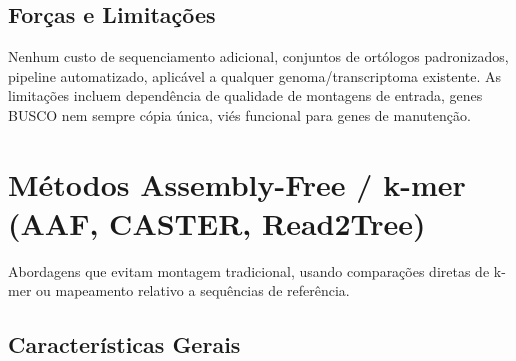 \subsection{Forças e Limitações}

Nenhum custo de sequenciamento adicional, conjuntos de ortólogos padronizados, pipeline automatizado, aplicável a qualquer genoma/transcriptoma existente. As limitações incluem dependência de qualidade de montagens de entrada, genes BUSCO nem sempre cópia única, viés funcional para genes de manutenção.

\textcite{simao2015, waterhouse2018, manni2021, sahbou2022}

\section{Métodos Assembly-Free / k-mer (AAF, CASTER, Read2Tree)}

Abordagens que evitam montagem tradicional, usando comparações diretas de k-mer ou mapeamento relativo a sequências de referência.

\subsection{Características Gerais}

